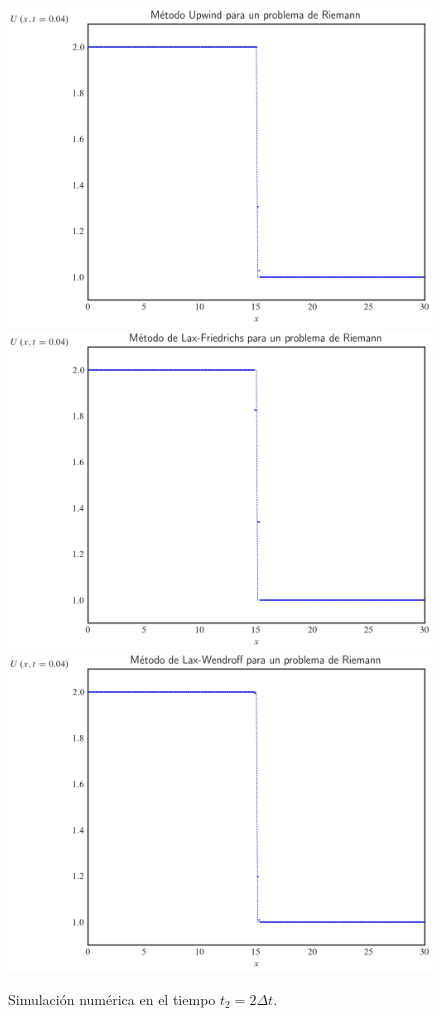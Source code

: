 \begin{figure}[ht!]
    \centering
    \includegraphics[width=.3\paperwidth]{../snapshots/upwindheaviside1d-2.png}
    \includegraphics[width=.3\paperwidth]{../snapshots/lax-friedrichsheaviside1d-2.png}
    \includegraphics[width=.3\paperwidth]{../snapshots/lax-wendroffheaviside1d-2.png}
    \caption{Simulación numérica en el tiempo $t_{2}=2\Delta t$.}
    \label{fig:example1t2}
\end{figure}

